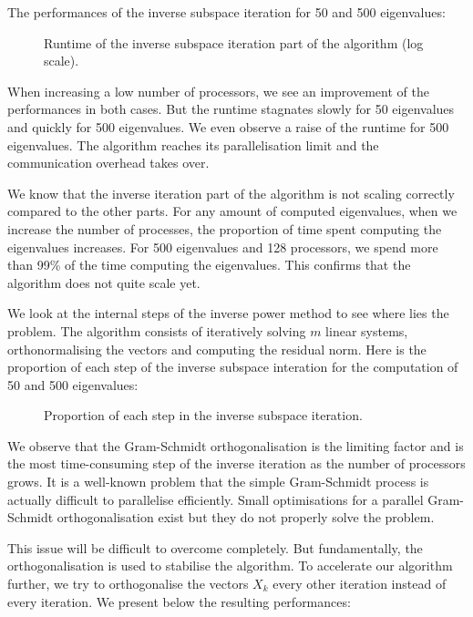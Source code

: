 The performances of the inverse subspace iteration for 50 and 500 eigenvalues:

\begin{figure}[H]
  \centering
  
  \caption{Runtime of the inverse subspace iteration part of the algorithm (log scale).}
\end{figure}

When increasing a low number of processors, we see an improvement of the performances in both cases.
But the runtime stagnates slowly for 50 eigenvalues and quickly for 500 eigenvalues.
We even observe a raise of the runtime for 500 eigenvalues.
The algorithm reaches its parallelisation limit and the communication overhead takes over.

We know that the inverse iteration part of the algorithm is not scaling correctly compared to the other parts.
For any amount of computed eigenvalues, when we increase the number of processes, the proportion of time spent computing the eigenvalues increases.
For 500 eigenvalues and 128 processors, we spend more than 99\% of the time computing the eigenvalues.
This confirms that the algorithm does not quite scale yet.

We look at the internal steps of the inverse power method to see where lies the problem.
The algorithm consists of iteratively solving \(m\) linear systems, orthonormalising the vectors and computing the residual norm.
Here is the proportion of each step of the inverse subspace interation for the computation of 50 and 500 eigenvalues:

\begin{figure}[H]
  \centering
  
  \caption{Proportion of each step in the inverse subspace iteration.}
\end{figure}

We observe that the Gram-Schmidt orthogonalisation is the limiting factor and is the most time-consuming step of the inverse iteration as the number of processors grows.
It is a well-known problem that the simple Gram-Schmidt process is actually difficult to parallelise efficiently.
Small optimisations for a parallel Gram-Schmidt orthogonalisation exist \cite{katagiri_parallel_gram_schmidt_2003} but they do not properly solve the problem.

This issue will be difficult to overcome completely.
But fundamentally, the orthogonalisation is used to stabilise the algorithm.
To accelerate our algorithm further, we try to orthogonalise the vectors \(X_k\) every other iteration instead of every iteration.
We present below the resulting performances:

